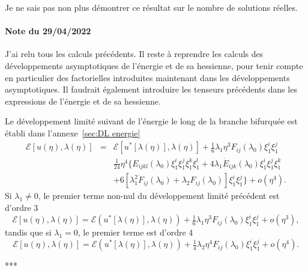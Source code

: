 \documentclass{article}
\newcommand{\mathlambda}{\lambda}
\newcommand{\nobracket}{}
\newcommand{\nocomma}{}
\begin{document}
\begin{remark}
  Je ne sais pas non plus démontrer ce résultat sur le nombre de
  solutions réelles.
\end{remark}

\begin{tmframed}
  \paragraph{Note du 29/04/2022}J'ai relu tous les calculs précédents.
  Il reste à reprendre les calculs des développements asymptotiques de
  l'énergie et de sa hessienne, pour tenir compte en particulier des
  factorielles introduites maintenant dans les développements
  asymptotiques. Il faudrait également introduire les tenseurs
  précédents dans les expressions de l'énergie et de sa hessienne.
\end{tmframed}

Le développement limité suivant de l'énergie le long de la branche
bifurquée est établi dans l'annexe~\ref{sec:DL energie}
\begin{eqnarray}
  \mathcal{E} [u (\eta), \lambda (\eta)] & = & \mathcal{E} [u^{\ast} [\lambda
  (\eta)], \lambda (\eta)] + \tfrac{1}{6} \lambda_1 \eta^3 F_{i \nocomma j}
  (\lambda_0) \xi_1^i \xi_1^j \nonumber\\
  &  & \tfrac{1}{24} \eta^4  \{ E_{i \nocomma j \nocomma k \nocomma l}
  (\lambda_0) \xi_1^i \xi_1^j \xi_1^k \xi_1^l + 4 \mathlambda_1  \dot{E}_{i
  \nocomma j \nocomma k} (\lambda_0) \xi_1^i \xi_1^j \xi_1^k \nobracket
  \nonumber\\
  &  & + \nobracket 6 [\mathlambda_1^2  \dot{F}_{i \nocomma j}
  (\mathlambda_0) + \lambda_2 F_{i \nocomma j} (\lambda_0)] \xi_1^i \xi_1^j \}
  + o (\eta^4) .  \label{eq:DL energie}
\end{eqnarray}
Si $\lambda_1 \neq 0$, le premier terme non-nul du développement
limité précédent est d'ordre 3
\begin{equation}
  \mathcal{E} [u (\eta), \lambda (\eta)] =\mathcal{E} (u^{\ast} [\lambda
  (\eta)], \lambda (\eta)) + \tfrac{1}{6} \lambda_1 \eta^3 F_{i \nocomma j}
  (\lambda_0) \xi_1^i \xi_1^j + o (\eta^3),
\end{equation}
tandis que si $\lambda_1 = 0$, le premier terme est d'ordre 4
\begin{equation}
  \mathcal{E} [u (\eta), \lambda (\eta)] =\mathcal{E} (u^{\ast} [\lambda
  (\eta)], \lambda (\eta)) + \tfrac{1}{4} \lambda_2 \eta^4 F_{i \nocomma j}
  (\lambda_0) \xi_1^i \xi_1^j + o (\eta^4) .
\end{equation}
\begin{center}
  ***
\end{center}
\end{document}
